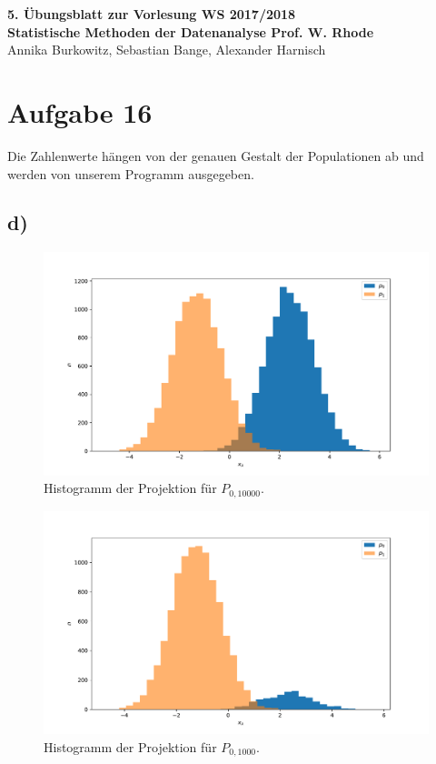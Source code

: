 \documentclass[a4paper, 11pt]{article}
\begin{document}
\noindent
\large{\textbf{5. Übungsblatt zur Vorlesung \hfill WS 2017/2018 \\
Statistische Methoden der Datenanalyse \hfill Prof. W. Rhode}} \\
Annika Burkowitz, Sebastian Bange, Alexander Harnisch \\
\noindent\makebox[\linewidth]{\rule{\textwidth}{0.4pt}}

\section*{Aufgabe 16}
Die Zahlenwerte hängen von der genauen Gestalt der Populationen ab und werden von unserem Programm ausgegeben.

\subsection*{d)}
\begin{figure}
    \centering
    \includegraphics[width=\textwidth]{../A16/A16d_10000.pdf}
    \caption{Histogramm der Projektion für $P_{0, 10000}$.}
    \label{fig:A16d_10000}
\end{figure}
\begin{figure}
    \centering
    \includegraphics[width=\textwidth]{../A16/A16d_1000.pdf}
    \caption{Histogramm der Projektion für $P_{0, 1000}$.}
    \label{fig:A16d_1000}
\end{figure}
\FloatBarrier
\end{document}
